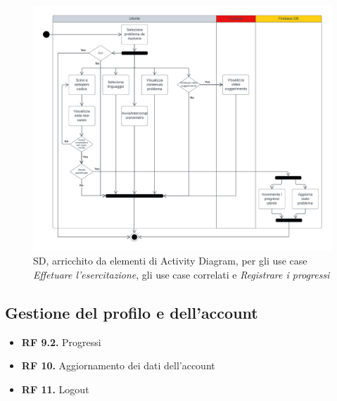 \documentclass[11pt, a4paper]{article}
\theoremstyle{definition} %
\begin{document}
\begin{figure}[H]
\centering
\hspace*{-0.5cm}
\includegraphics[scale=0.47]{materiale/acesercitazione.pdf}
\caption{SD, arricchito da elementi di Activity Diagram,
per gli use case \textit{Effetuare l'esercitazione}, gli use case correlati
e \textit{Registrare i progressi}}
\label{acexercise}
\end{figure}


\newpage
\subsection{Gestione del profilo e dell'account}
\begin{itemize}
    \item \textbf{RF 9.2.} Progressi
    \item \textbf{RF 10.} Aggiornamento dei dati dell'account
    \item \textbf{RF 11.} Logout
\end{itemize}
\end{document}
